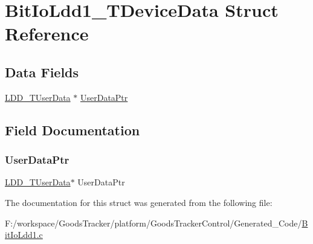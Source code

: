 \hypertarget{struct_bit_io_ldd1___t_device_data}{}\section{Bit\+Io\+Ldd1\+\_\+\+T\+Device\+Data Struct Reference}
\label{struct_bit_io_ldd1___t_device_data}
\subsection*{Data Fields}
\begin{DoxyCompactItemize}
\item 
\hyperlink{group___p_e___types__module_ga0b66a73f87238a782318aa0be7578e35}{L\+D\+D\+\_\+\+T\+User\+Data} $\ast$ \hyperlink{struct_bit_io_ldd1___t_device_data_a8e77b9d030b00c231823350a904e0f83}{User\+Data\+Ptr}
\end{DoxyCompactItemize}


\subsection{Field Documentation}
\mbox{\label{struct_bit_io_ldd1___t_device_data_a8e77b9d030b00c231823350a904e0f83}} 
\subsubsection{\texorpdfstring{User\+Data\+Ptr}{UserDataPtr}}
{\footnotesize\ttfamily \hyperlink{group___p_e___types__module_ga0b66a73f87238a782318aa0be7578e35}{L\+D\+D\+\_\+\+T\+User\+Data}$\ast$ User\+Data\+Ptr}



The documentation for this struct was generated from the following file\+:\begin{DoxyCompactItemize}
\item 
F\+:/workspace/\+Goods\+Tracker/platform/\+Goods\+Tracker\+Control/\+Generated\+\_\+\+Code/\hyperlink{_bit_io_ldd1_8c}{Bit\+Io\+Ldd1.\+c}\end{DoxyCompactItemize}
